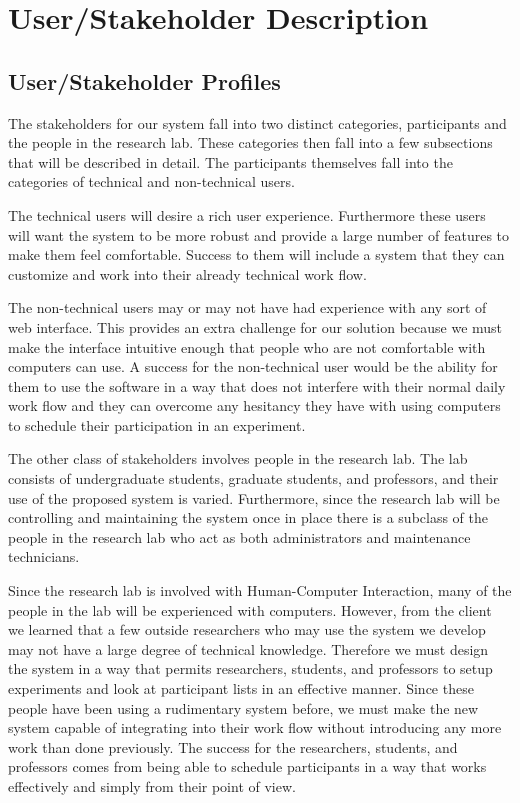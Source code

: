 \section{User/Stakeholder Description}
\subsection{User/Stakeholder Profiles}
The stakeholders for our system fall into two distinct categories, participants and the people in the research lab. These categories then fall into a few subsections that will be described in detail. The participants themselves fall into the categories of technical and non-technical users.

The technical users will desire a rich user experience. Furthermore these users will want the system to be more robust and provide a large number of features to make them feel comfortable. Success to them will include a system that they can customize and work into their already technical work flow.

The non-technical users may or may not have had experience with any sort of web interface. This provides an extra challenge for our solution because we must make the interface intuitive enough that people who are not comfortable with computers can use. A success for the non-technical user would be the ability for them to use the software in a way that does not interfere with their normal daily work flow and they can overcome any hesitancy they have with using computers to schedule their participation in an experiment.

The other class of stakeholders involves people in the research lab. The lab consists of undergraduate students, graduate students, and professors, and their use of the proposed system is varied. Furthermore, since the research lab will be controlling and maintaining the system once in place there is a subclass of the people in the research lab who act as both administrators and maintenance technicians.

Since the research lab is involved with Human-Computer Interaction, many of the people in the lab will be experienced with computers. However, from the client we learned that a few outside researchers who may use the system we develop may not have a large degree of technical knowledge. Therefore we must design the system in a way that permits researchers, students, and professors to setup experiments and look at participant lists in an effective manner. Since these people have been using a rudimentary system before, we must make the new system capable of integrating into their work flow without introducing any more work than done previously. The success for the researchers, students, and professors comes from being able to schedule participants in a way that works effectively and simply from their point of view.


